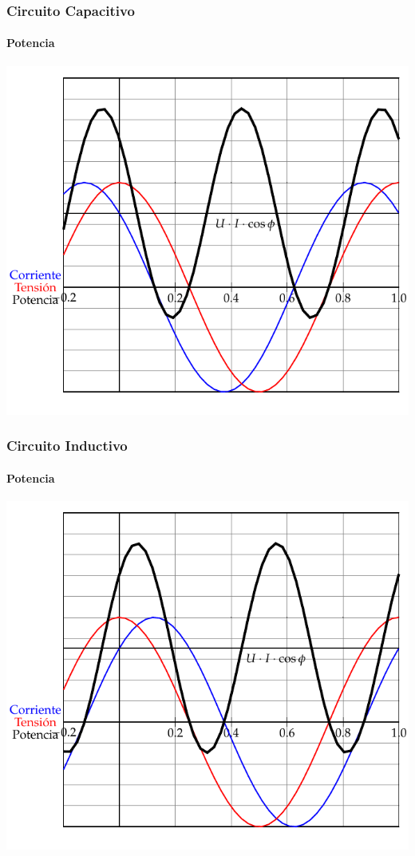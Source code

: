 \documentclass[serif, xcolor=dvipsnames]{beamer}
\begin{document}
\begin{frame}[plain]
  \frametitle{Circuito Capacitivo}


  \framesubtitle{Potencia}

  \begin{center}
    \includegraphics[scale=0.8]{../figs/PlotCircuitoCapacitivo_Potencia}
    \par\end{center}


\end{frame}
\begin{frame}[plain]
  \frametitle{Circuito Inductivo}


  \framesubtitle{Potencia}

  \begin{center}
    \includegraphics[scale=0.8]{../figs/PlotCircuitoInductivo_Potencia}
    \par\end{center}


\end{frame}
\end{document}
